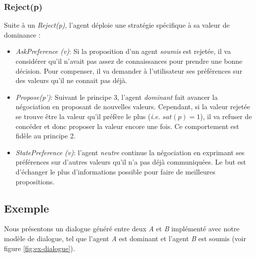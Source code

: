 	\subsubsection{Reject(p)}
	
	Suite à un \emph{Reject(p)}, l'agent déploie une stratégie spécifique à sa valeur de dominance :  
	
	\begin{itemize}   
		
		\item \emph{AskPreference (v)}: Si la proposition d'un agent \emph{soumis} est rejetée, il va considérer qu'il n'avait pas assez de connaissances pour prendre une bonne décision. Pour compenser, il va demander à l'utilisateur ses préférences sur des valeurs qu'il ne connait pas déjà. 
		
		\item \emph{Propose(p')}: Suivant le principe 3, l'agent \emph{dominant} fait avancer la négociation en proposant de nouvelles valeurs. Cependant, si la valeur rejetée se trouve être la valeur qu'il préfère le plus (\textit{i.e.} $sat(p) =1$), il va refuser de concéder et donc proposer la valeur encore une fois. Ce comportement est fidèle au principe 2. 
		
		\item \emph{StatePreference (v)}: l'agent \emph{neutre} continue la négociation en exprimant ses préférences sur d'autres valeurs qu'il n'a pas déjà communiquées. Le but est d'échanger le plus d'informations possible pour faire de meilleures propositions. 
		
	\end{itemize}
	
	\subsection{Exemple}
	
	Nous présentons un dialogue généré entre deux \textit{A} et \textit{B} implémenté avec notre modèle de dialogue, tel que l'agent \textit{A} est dominant et l'agent \textit{B} est soumis (voir figure \ref{fig:ex-dialogue}).
	
	

